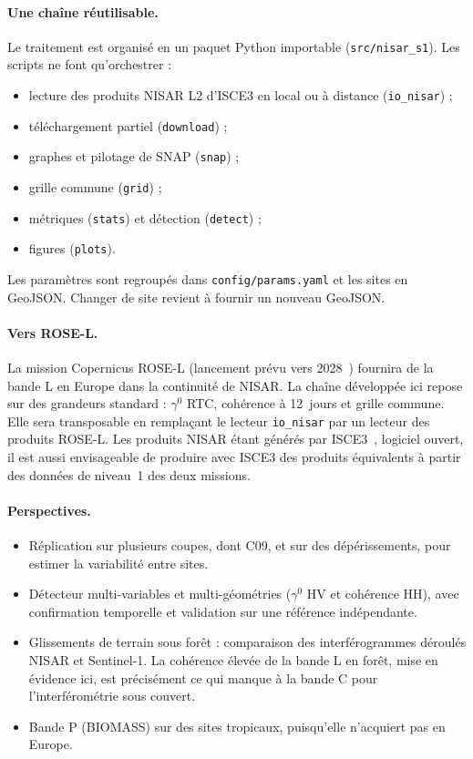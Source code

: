 \documentclass[11pt,a4paper]{article}
\begin{document}
\paragraph{Une chaîne réutilisable.} Le traitement est organisé en un paquet Python importable
(\texttt{src/nisar\_s1}). Les scripts ne font qu'orchestrer :
\begin{itemize}
\item lecture des produits NISAR L2 d'ISCE3 en local ou à distance (\texttt{io\_nisar}) ;
\item téléchargement partiel (\texttt{download}) ;
\item graphes et pilotage de SNAP (\texttt{snap}) ;
\item grille commune (\texttt{grid}) ;
\item métriques (\texttt{stats}) et détection (\texttt{detect}) ;
\item figures (\texttt{plots}).
\end{itemize}
Les paramètres sont regroupés dans \texttt{config/params.yaml} et les sites en GeoJSON. Changer de site revient à
fournir un nouveau GeoJSON.

\paragraph{Vers ROSE-L.} La mission Copernicus ROSE-L (lancement prévu vers 2028~\cite{esa2020rosel}) fournira de la
bande L en Europe dans la continuité de NISAR. La chaîne développée ici repose sur des grandeurs standard : $\gamma^0$ RTC,
cohérence à 12~jours et grille commune. Elle sera transposable en remplaçant le lecteur \texttt{io\_nisar} par un
lecteur des produits ROSE-L. Les produits NISAR étant générés par ISCE3~\cite{isce3}, logiciel ouvert, il est aussi
envisageable de produire avec ISCE3 des produits équivalents à partir des données de niveau~1 des deux missions.

\paragraph{Perspectives.}
\begin{itemize}
\item Réplication sur plusieurs coupes, dont C09, et sur des dépérissements, pour estimer la variabilité entre
  sites.
\item Détecteur multi-variables et multi-géométries ($\gamma^0$ HV et cohérence HH), avec confirmation temporelle et
  validation sur une référence indépendante.
\item Glissements de terrain sous forêt : comparaison des interférogrammes déroulés NISAR et Sentinel-1. La
  cohérence élevée de la bande L en forêt, mise en évidence ici, est précisément ce qui manque à la bande C pour
  l'interférométrie sous couvert.
\item Bande P (BIOMASS) sur des sites tropicaux, puisqu'elle n'acquiert pas en Europe.
\end{itemize}
\end{document}
